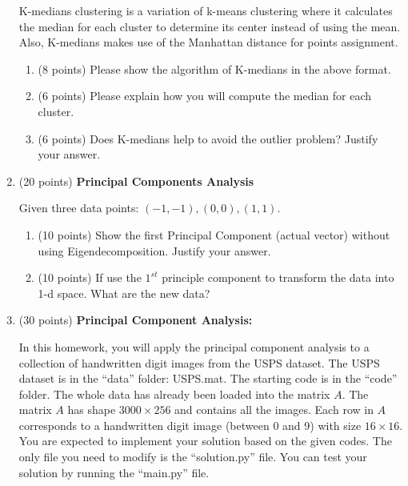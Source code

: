 \documentclass[11pt]{article}
\begin{document}
\begin{enumerate}
    K-medians clustering is a variation of k-means clustering
    where it calculates the median for each cluster to determine
    its center instead of using the mean. Also, K-medians makes
    use of the Manhattan distance for points assignment.
    
    \begin{enumerate}
        \item (8 points) Please show the algorithm of K-medians
        in the above format.


        \item (6 points) Please explain how you will compute the median
        for each cluster.


        \item (6 points) Does K-medians help to avoid the outlier
        problem? Justify your answer.

    \end{enumerate}
    

    \item (20 points) \textbf{ Principal Components Analysis}
    
    Given three data points: $(-1, -1), (0,0), (1,1)$.

    \begin{enumerate}
        \item (10 points) Show the first Principal Component
        (actual vector) without using Eigendecomposition. Justify
        your answer.

        
        \item (10 points) If use the $1^{st}$ principle component
        to transform the data into 1-d space. What are the new
        data?


    \end{enumerate}

    \item (30 points) \textbf{Principal Component Analysis:}
    
    In this homework, you will apply the principal component
    analysis to a collection of handwritten digit images from the
    USPS dataset. The USPS dataset is in the ``data'' folder:
    USPS.mat. The starting code is in the ``code'' folder. The
    whole data has already been loaded into the matrix $A$. The
    matrix $A$ has shape $3000\times 256$ and contains all the
    images. Each row in $A$ corresponds to a handwritten digit
    image (between 0 and 9) with size $16\times 16$. You are
    expected to implement your solution based on the given codes.
    The only file you need to modify is the ``solution.py'' file.
    You can test your solution by running the ``main.py'' file.
    

\end{enumerate}
\end{document}

